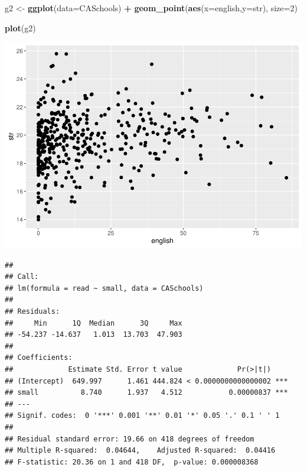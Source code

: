 \documentclass[
]{book}
\newenvironment{Shaded}{\begin{snugshade}}{\end{snugshade}}
\newcommand{\DataTypeTok}[1]{\textcolor[rgb]{0.13,0.29,0.53}{#1}}
\newcommand{\DecValTok}[1]{\textcolor[rgb]{0.00,0.00,0.81}{#1}}
\newcommand{\KeywordTok}[1]{\textcolor[rgb]{0.13,0.29,0.53}{\textbf{#1}}}
\newcommand{\NormalTok}[1]{#1}
\newcommand{\OperatorTok}[1]{\textcolor[rgb]{0.81,0.36,0.00}{\textbf{#1}}}
\newcommand{\StringTok}[1]{\textcolor[rgb]{0.31,0.60,0.02}{#1}}
\begin{document}
\begin{Shaded}
\begin{Highlighting}[]
\NormalTok{g2 <-}\StringTok{ }\KeywordTok{ggplot}\NormalTok{(}\DataTypeTok{data=}\NormalTok{CASchools) }\OperatorTok{+}\StringTok{ }
\StringTok{  }\KeywordTok{geom_point}\NormalTok{(}\KeywordTok{aes}\NormalTok{(}\DataTypeTok{x=}\NormalTok{english,}\DataTypeTok{y=}\NormalTok{str),   }\DataTypeTok{size=}\DecValTok{2}\NormalTok{) }

\KeywordTok{plot}\NormalTok{(g2)}
\end{Highlighting}
\end{Shaded}

\includegraphics{Metrics_files/figure-latex/unnamed-chunk-22-3.pdf}

\begin{Shaded}
\end{Shaded}

\begin{verbatim}
## 
## Call:
## lm(formula = read ~ small, data = CASchools)
## 
## Residuals:
##     Min      1Q  Median      3Q     Max 
## -54.237 -14.637   1.013  13.703  47.903 
## 
## Coefficients:
##             Estimate Std. Error t value             Pr(>|t|)    
## (Intercept)  649.997      1.461 444.824 < 0.0000000000000002 ***
## small          8.740      1.937   4.512           0.00000837 ***
## ---
## Signif. codes:  0 '***' 0.001 '**' 0.01 '*' 0.05 '.' 0.1 ' ' 1
## 
## Residual standard error: 19.66 on 418 degrees of freedom
## Multiple R-squared:  0.04644,    Adjusted R-squared:  0.04416 
## F-statistic: 20.36 on 1 and 418 DF,  p-value: 0.000008368
\end{verbatim}
\end{document}
